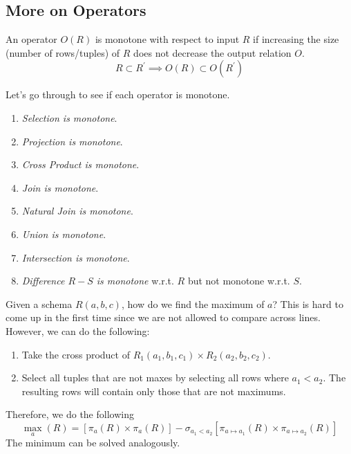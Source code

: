 \documentclass{article}
\begin{document}
  \subsection{More on Operators}
    
    \begin{definition}
      An operator $O(R)$ is monotone with respect to input $R$ if increasing the size (number of rows/tuples) of $R$ does not decrease the output relation $O$.  
      \begin{equation}
        R \subset R^\prime \implies O(R) \subset O(R^\prime)
      \end{equation}
    \end{definition}

    \begin{example}
      Let's go through to see if each operator is monotone. 
      \begin{enumerate}
        \item \textit{Selection is monotone}. 
        \item \textit{Projection is monotone}. 
        \item \textit{Cross Product is monotone}. 
        \item \textit{Join is monotone}. 
        \item \textit{Natural Join is monotone}. 
        \item \textit{Union is monotone}. 
        \item \textit{Intersection is monotone}. 
        \item \textit{Difference $R - S$ is monotone} w.r.t. $R$ but not monotone w.r.t. $S$.
      \end{enumerate}
    \end{example}

    \begin{example}
      Given a schema $R(a, b, c)$, how do we find the maximum of $a$? This is hard to come up in the first time since we are not allowed to compare across lines. However, we can do the following: 
      \begin{enumerate}
        \item Take the cross product of $R_1 (a_1, b_1, c_1) \times R_2 (a_2, b_2, c_2)$. 
        \item Select all tuples that are not maxes by selecting all rows where $a_1 < a_2$. The resulting rows will contain only those that are not maximums. 
      \end{enumerate}
      Therefore, we do the following 
      \begin{equation}
        \max_a (R) = [\pi_a (R) \times \pi_a (R)] - \sigma_{a_1 < a_2} [\pi_{a \mapsto a_1} (R) \times \pi_{a \mapsto a_2} (R)]
      \end{equation}
      The minimum can be solved analogously. 
    \end{example}
\end{document}
